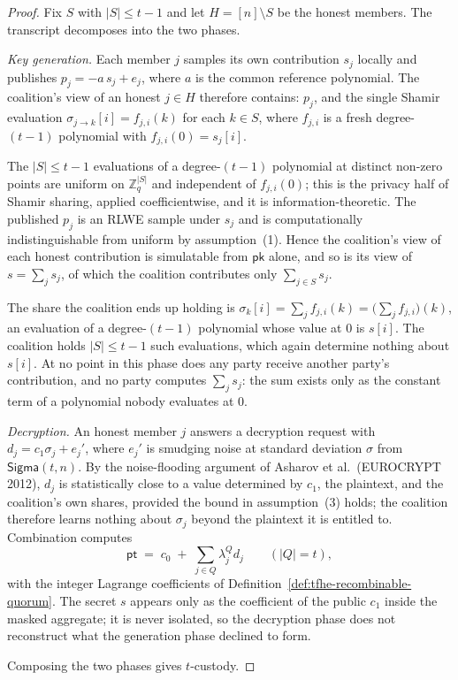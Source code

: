 \begin{proof}
Fix $S$ with $|S| \le t-1$ and let $H = [n] \setminus S$ be the honest
members. The transcript decomposes into the two phases.

\emph{Key generation.} Each member $j$ samples its own contribution $s_j$
locally and publishes $p_j = -a\,s_j + e_j$, where $a$ is the common
reference polynomial. The coalition's view of an honest $j \in H$ therefore
contains: $p_j$, and the single Shamir evaluation $\sigma_{j \to k}[i] =
f_{j,i}(k)$ for each $k \in S$, where $f_{j,i}$ is a fresh degree-$(t-1)$
polynomial with $f_{j,i}(0) = s_j[i]$.

The $|S| \le t-1$ evaluations of a degree-$(t-1)$ polynomial at distinct
non-zero points are uniform on $\mathbb{Z}_q^{|S|}$ and independent of
$f_{j,i}(0)$; this is the privacy half of Shamir sharing, applied
coefficientwise, and it is information-theoretic. The published $p_j$ is an
RLWE sample under $s_j$ and is computationally indistinguishable from uniform
by assumption~(1). Hence the coalition's view of each honest contribution is
simulatable from $\mathsf{pk}$ alone, and so is its view of
$s = \sum_{j} s_j$, of which the coalition contributes only
$\sum_{j \in S} s_j$.

The share the coalition ends up holding is
$\sigma_k[i] = \sum_{j} f_{j,i}(k) = \bigl(\sum_j f_{j,i}\bigr)(k)$, an
evaluation of a degree-$(t-1)$ polynomial whose value at $0$ is $s[i]$. The
coalition holds $|S| \le t-1$ such evaluations, which again determine nothing
about $s[i]$. At no point in this phase does any party receive another
party's contribution, and no party computes $\sum_j s_j$: the sum exists only
as the constant term of a polynomial nobody evaluates at $0$.

\emph{Decryption.} An honest member $j$ answers a decryption request with
$d_j = c_1 \sigma_j + e_j'$, where $e_j'$ is smudging noise at standard
deviation $\sigma$ from $\mathsf{Sigma}(t,n)$. By the noise-flooding
argument of Asharov et al.\ (EUROCRYPT 2012), $d_j$ is statistically close to
a value determined by $c_1$, the plaintext, and the coalition's own shares,
provided the bound in assumption~(3) holds; the coalition therefore learns
nothing about $\sigma_j$ beyond the plaintext it is entitled to. Combination
computes
\[
  \mathsf{pt} \;=\; c_0 \;+\; \sum_{j \in Q} \lambda_j^{Q} d_j
  \qquad (|Q| = t),
\]
with the integer Lagrange coefficients of
Definition~\ref{def:tfhe-recombinable-quorum}. The secret $s$ appears only as
the coefficient of the public $c_1$ inside the masked aggregate; it is never
isolated, so the decryption phase does not reconstruct what the generation
phase declined to form.

Composing the two phases gives $t$-custody.
\end{proof}

